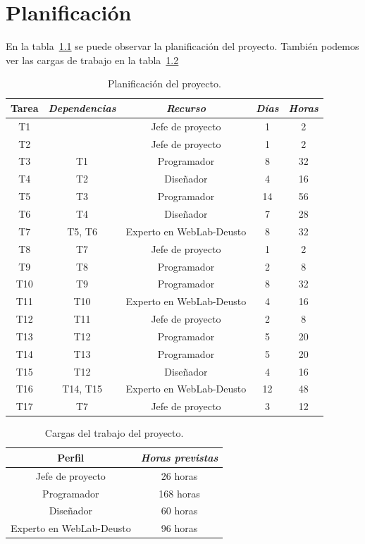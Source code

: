 \chapter{Planificación}

En la tabla~\ref{tab:plan} se puede observar la planificación del proyecto. También podemos ver las
cargas de trabajo en la tabla~\ref{tab:work}

\begin{table}[h]
	\centering
	\caption{Planificación del proyecto.}\label{tab:plan}
	\begin{tabular}{ccccc}
		\toprule
		\textbf{Tarea} & \emph{Dependencias} & \emph{Recurso} & \emph{Días} & \emph{Horas} \\
		\midrule
		T1	&				& Jefe de proyecto			& 1		&	2	\\
		T2	&				& Jefe de proyecto			& 1		&	2	\\
		T3	&	T1			& Programador				& 8		&	32	\\
		T4	&	T2			& Diseñador					& 4		&	16	\\
		T5	&	T3			& Programador				& 14	&	56	\\
		T6	&	T4			& Diseñador					& 7		&	28	\\
		T7	&	T5, T6		& Experto en WebLab-Deusto	& 8		&	32	\\
		T8	&	T7			& Jefe de proyecto			& 1		&	2	\\
		T9	&	T8			& Programador				& 2		&	8	\\
		T10	&	T9			& Programador				& 8		&	32	\\
		T11	&	T10			& Experto en WebLab-Deusto	& 4		&	16	\\
		T12	&	T11			& Jefe de proyecto			& 2		&	8	\\
		T13	&	T12			& Programador				& 5		&	20	\\
		T14	&	T13			& Programador				& 5		&	20	\\
		T15	&	T12			& Diseñador					& 4		&	16	\\
		T16	&	T14, T15	& Experto en WebLab-Deusto	& 12	&	48	\\
		T17	&	T7			& Jefe de proyecto			& 3		&	12	\\
		\bottomrule
	\end{tabular}
\end{table}

\begin{table}[h]
	\centering
	\caption{Cargas del trabajo del proyecto.}\label{tab:work}
	\begin{tabular}{cc}
		\toprule
		\textbf{Perfil} & \emph{Horas previstas} \\
		\midrule
		Jefe de proyecto			&	26 horas	\\
		Programador					&	168 horas	\\
		Diseñador					&	60 horas	\\
		Experto en WebLab-Deusto	&	96 horas	\\
		\bottomrule
	\end{tabular}
\end{table}

